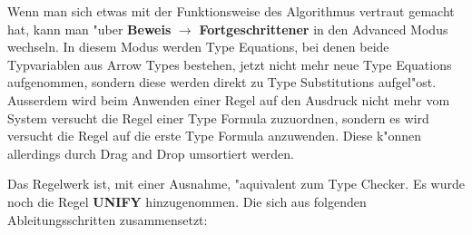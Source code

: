 Wenn man sich etwas mit der Funktionsweise des Algorithmus vertraut gemacht hat,
kann man "uber {\bf Beweis} $\rightarrow$ {\bf Fortgeschrittener} in den 
Advanced Modus wechseln. In diesem Modus werden Type Equations, bei denen beide
Typvariablen aus Arrow Types bestehen, jetzt nicht mehr neue Type Equations
aufgenommen, sondern diese werden direkt zu Type Substitutions aufgel"ost.
Ausserdem wird beim Anwenden einer Regel auf den Ausdruck nicht mehr vom System
versucht die Regel einer Type Formula zuzuordnen, sondern es wird versucht die Regel
auf die erste Type Formula anzuwenden. Diese k"onnen allerdings durch Drag 
and Drop umsortiert werden.

Das Regelwerk ist, mit einer Ausnahme, "aquivalent zum Type Checker. Es wurde 
noch die Regel {\bf UNIFY} hinzugenommen. Die sich aus folgenden Ableitungsschritten
zusammensetzt:\\[4mm] 

